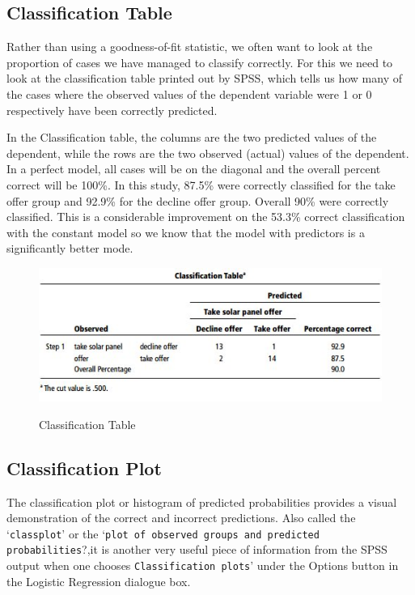 \documentclass[a4paper,12pt]{article}
\begin{document}
\subsection{Classification Table}
Rather than using a goodness-of-fit statistic, we often want to look at the proportion of cases we have managed to classify correctly. For this we need to look at the classification table printed out by SPSS, which tells us how many of the cases where the observed values of the dependent variable were 1 or 0 respectively have
been correctly predicted.

In the Classification table, the columns are the two predicted values of the dependent, while the rows are the two observed (actual) values of the dependent. In a perfect model, all cases will be on the diagonal and the
overall percent correct will be 100\%. In this study, 87.5\% were correctly classified for the take offer group and 92.9\% for the decline offer group. Overall 90\% were correctly classified. This is a considerable improvement on the 53.3\% correct classification with the constant model so we know that the model with predictors is a significantly better mode.
\begin{figure}[h!]
	\begin{center}
		\includegraphics[scale=0.6]{images/Logistic7}\\
		\caption{Classification Table}
	\end{center}
\end{figure}

\subsection{Classification Plot} 
The classification plot or histogram of predicted probabilities
provides a visual demonstration of the correct and incorrect predictions. Also called the `\texttt{classplot}' or the `\texttt{plot of observed groups and predicted probabilities}?,it is another very useful piece of information from the SPSS output when one chooses
\texttt{Classification plots}' under the Options button in the Logistic Regression dialogue box.
\end{document}
